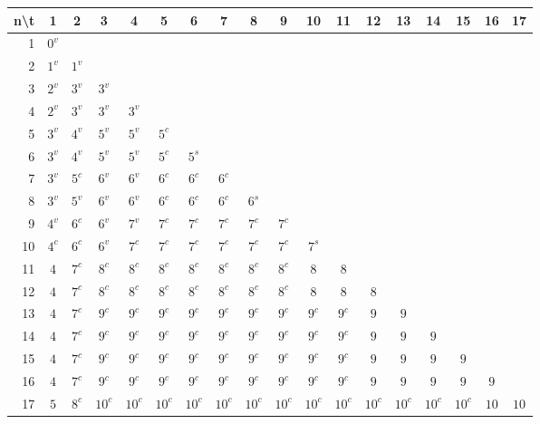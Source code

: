\begin{tabular}{rccccccccccccccccc}
n\backslash t & 1 & 2 & 3 & 4 & 5 & 6 & 7 & 8 & 9 & 10 & 11 & 12 & 13 & 14 & 15 & 16 & 17 \\
\hline
1 & $0^{v}$ &  &  &  &  &  &  &  &  &  &  &  &  &  &  &  &  \\
2 & $1^{v}$ & $1^{v}$ &  &  &  &  &  &  &  &  &  &  &  &  &  &  &  \\
3 & $2^{v}$ & $3^{v}$ & $3^{v}$ &  &  &  &  &  &  &  &  &  &  &  &  &  &  \\
4 & $2^{v}$ & $3^{v}$ & $3^{v}$ & $3^{v}$ &  &  &  &  &  &  &  &  &  &  &  &  &  \\
5 & $3^{v}$ & $4^{v}$ & $5^{v}$ & $5^{v}$ & $5^{c}$ &  &  &  &  &  &  &  &  &  &  &  &  \\
6 & $3^{v}$ & $4^{v}$ & $5^{v}$ & $5^{v}$ & $5^{c}$ & $5^{s}$ &  &  &  &  &  &  &  &  &  &  &  \\
7 & $3^{v}$ & $5^{c}$ & $6^{v}$ & $6^{v}$ & $6^{c}$ & $6^{c}$ & $6^{c}$ &  &  &  &  &  &  &  &  &  &  \\
8 & $3^{v}$ & $5^{v}$ & $6^{v}$ & $6^{v}$ & $6^{c}$ & $6^{c}$ & $6^{c}$ & $6^{s}$ &  &  &  &  &  &  &  &  &  \\
9 & $4^{v}$ & $6^{c}$ & $6^{v}$ & $7^{v}$ & $7^{c}$ & $7^{c}$ & $7^{c}$ & $7^{c}$ & $7^{c}$ &  &  &  &  &  &  &  &  \\
10 & $4^{c}$ & $6^{c}$ & $6^{v}$ & $7^{c}$ & $7^{c}$ & $7^{c}$ & $7^{c}$ & $7^{c}$ & $7^{c}$ & $7^{s}$ &  &  &  &  &  &  &  \\
11 & $4$ & $7^{c}$ & $8^{c}$ & $8^{c}$ & $8^{c}$ & $8^{c}$ & $8^{c}$ & $8^{c}$ & $8^{c}$ & $8$ & $8$ &  &  &  &  &  &  \\
12 & $4$ & $7^{c}$ & $8^{c}$ & $8^{c}$ & $8^{c}$ & $8^{c}$ & $8^{c}$ & $8^{c}$ & $8^{c}$ & $8$ & $8$ & $8$ &  &  &  &  &  \\
13 & $4$ & $7^{c}$ & $9^{c}$ & $9^{c}$ & $9^{c}$ & $9^{c}$ & $9^{c}$ & $9^{c}$ & $9^{c}$ & $9^{c}$ & $9^{c}$ & $9$ & $9$ &  &  &  &  \\
14 & $4$ & $7^{c}$ & $9^{c}$ & $9^{c}$ & $9^{c}$ & $9^{c}$ & $9^{c}$ & $9^{c}$ & $9^{c}$ & $9^{c}$ & $9^{c}$ & $9$ & $9$ & $9$ &  &  &  \\
15 & $4$ & $7^{c}$ & $9^{c}$ & $9^{c}$ & $9^{c}$ & $9^{c}$ & $9^{c}$ & $9^{c}$ & $9^{c}$ & $9^{c}$ & $9^{c}$ & $9$ & $9$ & $9$ & $9$ &  &  \\
16 & $4$ & $7^{c}$ & $9^{c}$ & $9^{c}$ & $9^{c}$ & $9^{c}$ & $9^{c}$ & $9^{c}$ & $9^{c}$ & $9^{c}$ & $9^{c}$ & $9$ & $9$ & $9$ & $9$ & $9$ &  \\
17 & $5$ & $8^{c}$ & $10^{c}$ & $10^{c}$ & $10^{c}$ & $10^{c}$ & $10^{c}$ & $10^{c}$ & $10^{c}$ & $10^{c}$ & $10^{c}$ & $10^{c}$ & $10^{c}$ & $10^{c}$ & $10^{c}$ & $10$ & $10$ \\
\end{tabular}
